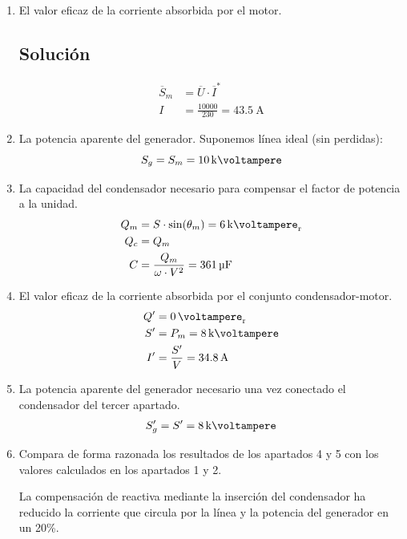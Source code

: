 \begin{enumerate}
\item El valor eficaz de la corriente absorbida por el motor.

\subsection*{Solución}


  \begin{align*}
  \overline{S}_m &= \overline{U} \cdot \overline{I}^*\\
%
  I &= \frac{\num{10000}}{230} = \qty{43.5}{\ampere}
\end{align*}

\item La potencia aparente del generador.
Suponemos línea ideal (sin perdidas):
\[
  S_g = S_m = \qty{10}{\kilo\voltampere} 
\]

\item La capacidad del condensador necesario para compensar el factor de potencia a la unidad.
\begin{align*}
Q_m &= S \cdot \sin(\theta_m) = \qty{6}{\kilo\voltampere_r}\\
Q_c &= Q_m\\
C &= \frac{Q_m}{\omega \cdot V^2} = \qty{361}{\micro\farad}
\end{align*}

\item El valor eficaz de la corriente absorbida por el conjunto condensador-motor. 
\begin{align*}
Q' &= \qty{0}{\voltampere_r}\\
S' &= P_m = \qty{8}{\kilo\voltampere}\\
I' &= \frac{S'}{V} = \qty{34.8}{\ampere}
\end{align*}

\item La potencia aparente del generador necesario una vez conectado el condensador del tercer apartado.
\begin{align*}
S'_g &= S' = \qty{8}{\kilo\voltampere}\\
\end{align*}

\item Compara de forma razonada los resultados de los apartados 4 y 5 con los valores calculados en los apartados 1 y 2.

  La compensación de reactiva mediante la inserción del condensador ha reducido la corriente que circula por la línea y la potencia del generador en un 20\%.

\end{enumerate}

